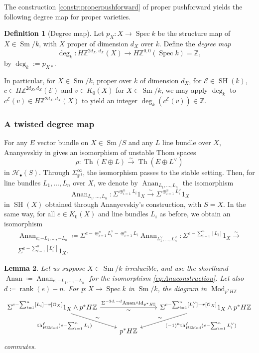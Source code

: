 \documentclass[10pt]{amsart}
\theoremstyle{definition}
\newtheorem{defn}{Definition}[section]
\theoremstyle{plain}
\newtheorem{lemma}[defn]{Lemma}
\numberwithin{equation}{section}
\newcommand{\0}{\emptyset}
\newcommand{\sE}{{\mathcal E}}
\newcommand{\sH}{{\mathcal H}}
\renewcommand{\P}{{\mathbb P}}
\newcommand{\Z}{{\mathbb Z}}
\newcommand{\Spec}{{\operatorname{Spec}}}
\newcommand{\SH}{{\operatorname{SH}}}
\newcommand{\Th}{{\operatorname{Th}}}
\newcommand{\Sm}{{\operatorname{Sm}}}
\renewcommand{\th}{{\operatorname{th}}}
\renewcommand{\deg}{{\operatorname{deg}}}
\newcommand{\Mod}{{\operatorname{Mod}}}
\newcommand{\rnk}{{\operatorname{rank}}}
\newcommand{\id}{{\operatorname{id}}}
\newcommand{\Anan}{{\operatorname{Anan}}}
\begin{document}
The construction \ref{constr:properpushforward} of proper pushforward yields the following degree map for proper varieties.

\begin{defn}[Degree map]\label{defn:Degree}  Let $p_X:X\to \Spec k$ be the structure map of $X\in \Sm/k$, with $X$ proper of dimension $d_X$ over $k$. Define the  {\em degree map}
\[
\deg_k:H\Z^{2d_X,d_X}(X)\to H\Z^{0,0}(\Spec k)=\Z,
\]
by $\deg_k:=p_{X*}$.  
\end{defn}

In particular, for $X\in \Sm/k$, proper over $k$ of dimension $d_X$, for $\sE\in \SH(k)$,   $c\in H\Z^{2d_X, d_X}(\sE)$ and  $v\in K_0(X)$ for $X\in \Sm/k$, we may apply $\deg_k$ to  $c^\sE(v)\in H\Z^{2d_X,d_X}(X)$
to yield an integer $\deg_k(c^\sE(v))\in \Z$.

\subsubsection{A twisted degree map}
\label{subsec:TwistedDegree}

For any $E$ vector bundle on $X \in \Sm/S$ and any $L$ line bundle over $X$, Ananyevskiy in \cite[Lemma 4.1]{Ana:Slor} gives an isomorphism of unstable Thom spaces
$$\rho: \Th(E\oplus L)\xrightarrow{\sim} \Th(E \oplus L^{\vee})$$
in $\sH_{\bullet}(S)$. Through $\Sigma^{\infty}_{\P^1}$, the isomorphism passes to the stable setting. Then, for line bundles $L_1, \ldots, L_n$ over $X$, we denote by $\Anan_{L_1, \ldots, L_n}$ the isomorphism
\begin{equation}
    \label{eqn:AnanIso}
    \Anan_{L_1,\ldots, L_n}: \Sigma^{\oplus_{i=1}^n L_i}1_X \xrightarrow{\sim} \Sigma^{\oplus_{i=1}^n L_i^\vee}1_X
\end{equation}
in $\SH(X)$ obtained through Ananyevskiy's construction, with $S=X$. In the same way, for all $e \in K_0(X)$ and line bundles $L_i$ as before, we obtain an isomorphism
\begin{multline}
\label{eq:Anaconstruction}
    \Anan_{e;-L_1, \ldots, -L_n} \coloneqq \Sigma^{e-\oplus_{i=1}^nL_i^\vee-
    \oplus_{i=1}^nL_i} \Anan_{L_1^\vee,\ldots, L_n^\vee}: \Sigma^{e-\sum_{i=1}^n[L_i]}1_X\xrightarrow{\sim} \\ \Sigma^{e-\sum_{i=1}^n[L_i^\vee]}1_X.
\end{multline}

\begin{lemma}\label{lem:Anan} Let us suppose $X \in \Sm/k$ irreducible, and use the shorthand $\Anan \coloneqq \Anan_{e;-L_1,\ldots,-L_n}$ for the isomorphism \eqref{eq:Anaconstruction}. Let also $d\coloneqq \rnk(e)-n$. For $p:X\to \Spec k$ in $\Sm/k$, the diagram in $\Mod_{p^*H\Z}$
$$
\begin{tikzcd}
\Sigma^{e- \sum_{i=1}^n[L_i] - r[\mathcal{O}_X]}1_X\wedge p^*H\Z \arrow[rr, "\Sigma^{-2d,-d} \Anan\wedge\id_{p^*H\Z}", "\sim"'] \arrow[dr, swap, "\th_{H\Z\Mod}^f (e- \sum_{i=1}^nL_i)", "\sim"'] && \Sigma^{e-\sum_{i=1}^n[L_i^\vee]-r[\mathcal{O}_X]}1_X\wedge p^*H\Z \arrow[dl, "(-1)^n\th^f_{H\Z\Mod} (e-\sum_{i=1}^nL_i^\vee)", "\sim"'] \\
& p^*H\Z &
\end{tikzcd}
$$
commutes.
\end{lemma}
\end{document}
